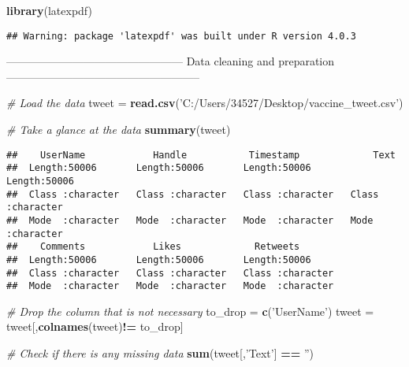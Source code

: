 \documentclass[
]{article}
\newenvironment{Shaded}{\begin{snugshade}}{\end{snugshade}}
\newcommand{\CommentTok}[1]{\textcolor[rgb]{0.56,0.35,0.01}{\textit{#1}}}
\newcommand{\KeywordTok}[1]{\textcolor[rgb]{0.13,0.29,0.53}{\textbf{#1}}}
\newcommand{\NormalTok}[1]{#1}
\newcommand{\OperatorTok}[1]{\textcolor[rgb]{0.81,0.36,0.00}{\textbf{#1}}}
\newcommand{\StringTok}[1]{\textcolor[rgb]{0.31,0.60,0.02}{#1}}
\begin{document}
\begin{Shaded}
\begin{Highlighting}[]
\KeywordTok{library}\NormalTok{(latexpdf)}
\end{Highlighting}
\end{Shaded}

\begin{verbatim}
## Warning: package 'latexpdf' was built under R version 4.0.3
\end{verbatim}

------------------------------------------------ Data cleaning and
preparation -----------------------------------------------------

\begin{Shaded}
\begin{Highlighting}[]
\CommentTok{# Load the data}
\NormalTok{tweet =}\StringTok{ }\KeywordTok{read.csv}\NormalTok{(}\StringTok{'C:/Users/34527/Desktop/vaccine_tweet.csv'}\NormalTok{)}

\CommentTok{# Take a glance at the data}
\KeywordTok{summary}\NormalTok{(tweet)}
\end{Highlighting}
\end{Shaded}

\begin{verbatim}
##    UserName            Handle           Timestamp             Text          
##  Length:50006       Length:50006       Length:50006       Length:50006      
##  Class :character   Class :character   Class :character   Class :character  
##  Mode  :character   Mode  :character   Mode  :character   Mode  :character  
##    Comments            Likes             Retweets        
##  Length:50006       Length:50006       Length:50006      
##  Class :character   Class :character   Class :character  
##  Mode  :character   Mode  :character   Mode  :character
\end{verbatim}

\begin{Shaded}
\begin{Highlighting}[]
\CommentTok{# Drop the column that is not necessary}
\NormalTok{to_drop =}\StringTok{ }\KeywordTok{c}\NormalTok{(}\StringTok{'UserName'}\NormalTok{)}
\NormalTok{tweet =}\StringTok{ }\NormalTok{tweet[,}\KeywordTok{colnames}\NormalTok{(tweet)}\OperatorTok{!=}\StringTok{ }\NormalTok{to_drop]}

\CommentTok{# Check if there is any missing data}
\KeywordTok{sum}\NormalTok{(tweet[,}\StringTok{'Text'}\NormalTok{] }\OperatorTok{==}\StringTok{ ''}\NormalTok{)}
\end{Highlighting}
\end{Shaded}
\end{document}
